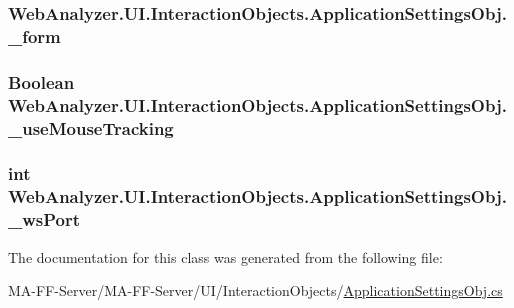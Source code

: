 \subsubsection[{\+\_\+form}]{ Web\+Analyzer.\+U\+I.\+Interaction\+Objects.\+Application\+Settings\+Obj.\+\_\+form\hspace{0.3cm}{\ttfamily [private]}}\label{class_web_analyzer_1_1_u_i_1_1_interaction_objects_1_1_application_settings_obj_a6b08a377c6dc1e9f0e32d0c786012756}
\hypertarget{class_web_analyzer_1_1_u_i_1_1_interaction_objects_1_1_application_settings_obj_a91a38f0e61ad09629d88131e49888523}{}
\subsubsection[{\+\_\+use\+Mouse\+Tracking}]{\setlength{\rightskip}{0pt plus 5cm}Boolean Web\+Analyzer.\+U\+I.\+Interaction\+Objects.\+Application\+Settings\+Obj.\+\_\+use\+Mouse\+Tracking\hspace{0.3cm}{\ttfamily [private]}}\label{class_web_analyzer_1_1_u_i_1_1_interaction_objects_1_1_application_settings_obj_a91a38f0e61ad09629d88131e49888523}
\hypertarget{class_web_analyzer_1_1_u_i_1_1_interaction_objects_1_1_application_settings_obj_aa8f8de8781d5d9fb22fa8b1d35ccf731}{}
\subsubsection[{\+\_\+ws\+Port}]{\setlength{\rightskip}{0pt plus 5cm}int Web\+Analyzer.\+U\+I.\+Interaction\+Objects.\+Application\+Settings\+Obj.\+\_\+ws\+Port\hspace{0.3cm}{\ttfamily [private]}}\label{class_web_analyzer_1_1_u_i_1_1_interaction_objects_1_1_application_settings_obj_aa8f8de8781d5d9fb22fa8b1d35ccf731}


The documentation for this class was generated from the following file\+:\begin{DoxyCompactItemize}
\item 
M\+A-\/\+F\+F-\/\+Server/\+M\+A-\/\+F\+F-\/\+Server/\+U\+I/\+Interaction\+Objects/\hyperlink{_application_settings_obj_8cs}{Application\+Settings\+Obj.\+cs}\end{DoxyCompactItemize}
